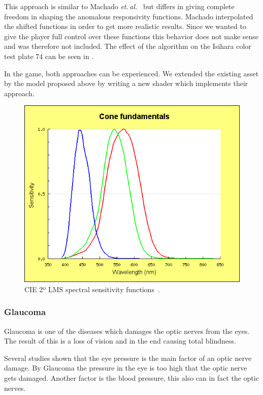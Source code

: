 \documentclass{sig-alternate-05-2015}
\newcommand{\etal}{\textit{et. al.}}
\begin{document}
This approach is similar to Machado \etal~\cite{Machado2009} but differs in giving complete freedom in shaping the anomalous responsivity functions.
Machado interpolated the shifted functions in order to get more realistic results.
Since we wanted to give the player full control over these functions this behavior does not make sense and was therefore not included.
The effect of the algorithm on the Isihara color test plate 74 can be seen in .

In the game, both approaches can be experienced.
We extended the existing asset by the model proposed above by writing a new shader which implements their approach.

\begin{figure}
    \centering
    \includegraphics[width=\columnwidth]{lms-sensitivity.png}
    \caption{CIE 2º LMS spectral sensitivity functions~\cite{cvrl-lms-web}.}
    \label{fig:lmscurves}
\end{figure}

\subsubsection{Glaucoma}

Glaucoma is one of the diseases which damages the optic nerves from the eyes. The result of this is a loss of vision and in the end causing total blindness. 

Several studies shown that the eye pressure is the main factor of an optic nerve damage. By Glaucoma the pressure in the eye is too high that the optic nerve gets damaged. Another factor is the blood pressure, this also can in fact the optic nerves.
\end{document}
